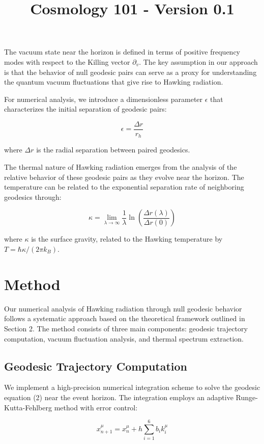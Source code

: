 \documentclass{article}\usepackage{graphicx} \usepackage{amsmath} \usepackage{colortbl}\title{Cosmology 101 - Version 0.1}
\begin{document}
The vacuum state near the horizon is defined in terms of positive frequency modes with respect to the Killing vector $\partial_v$. The key assumption in our approach is that the behavior of null geodesic pairs can serve as a proxy for understanding the quantum vacuum fluctuations that give rise to Hawking radiation.

For numerical analysis, we introduce a dimensionless parameter $\epsilon$ that characterizes the initial separation of geodesic pairs:

\begin{equation}
\epsilon = \frac{\Delta r}{r_h}
\end{equation}

where $\Delta r$ is the radial separation between paired geodesics.

The thermal nature of Hawking radiation emerges from the analysis of the relative behavior of these geodesic pairs as they evolve near the horizon. The temperature can be related to the exponential separation rate of neighboring geodesics through:

\begin{equation}
\kappa = \lim_{\lambda \to \infty} \frac{1}{\lambda} \ln\left(\frac{\Delta r(\lambda)}{\Delta r(0)}\right)
\end{equation}

where $\kappa$ is the surface gravity, related to the Hawking temperature by $T = \hbar\kappa/(2\pi k_B)$.\section{Method}
Our numerical analysis of Hawking radiation through null geodesic behavior follows a systematic approach based on the theoretical framework outlined in Section 2. The method consists of three main components: geodesic trajectory computation, vacuum fluctuation analysis, and thermal spectrum extraction.

\subsection{Geodesic Trajectory Computation}

We implement a high-precision numerical integration scheme to solve the geodesic equation (2) near the event horizon. The integration employs an adaptive Runge-Kutta-Fehlberg method with error control:

\begin{equation}
x^\mu_{n+1} = x^\mu_n + h\sum_{i=1}^6 b_i k_i^\mu
\end{equation}
\end{document}
